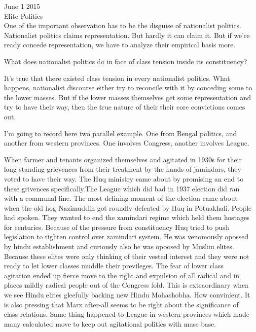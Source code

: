 \documentclass[14pt]{extarticle}
\begin{document}

\title{}

{\Huge June 1 2015 }\\[5mm]

{\Large  Elite Politics}\\[3mm] One of the important observation has to be the
disguise of nationalist politics. Nationalist politics claims representation.
But hardly it can claim it. But if we're ready concede representation, we have
to analyze their empirical basis more. \par

What does nationalist politics do in face of class tension  inside its
constituency?\par

It's true that there existed class tension in every nationalist politics. What
happens, nationalist discourse either try to reconcile with it by conceding
some to the lower masses. But if the lower masses themselves get some
representation and try to have their way, then the true nature  of their their
core convictions comes out. \par

I'm going to record here two parallel example. One from Bengal politics, and
another from  western provinces. One involves Congress, another involves
League.\par When farmer and tenants organized themselves and agitated in 1930s
for their long standing grievences from their treatment by the hands of
jamindars, they voted to have their way. The Huq ministry came about by
promising an end to these grivences specifically.The League which did bad in
1937 election did ran with a communal line. The most defining moment of the
election came about when the old hog Nazimuddin got roundly defeated by Huq in
Potuakhali. People had spoken. They wanted to end the zamindari regime which
held them hostages for centuries. Because of the pressure from constituency Huq
tried to push legislation to tighten control over zamindari system. He was
venomously opossed by hindu establishment and curiously also he was opoosed by
Muslim elites. Because these elites were only thinking of their vested interest
and they were not ready to let lower classes muddle their previleges. The fear
of lower class agitation ended up fierce move to the right and expulsion of all
radical and in places mildly radical people out of the Congress fold. This is
extraordinary when we see Hindu elites gleefully backing new Hindu Mohashobha.
How convinient. It is also pressing that Marx after-all seems to be right about
the significance of class relations. Same thing happened to League in western
provinces which made many calculated move to keep out agitational politics with
mass base.\par
\end{document}
